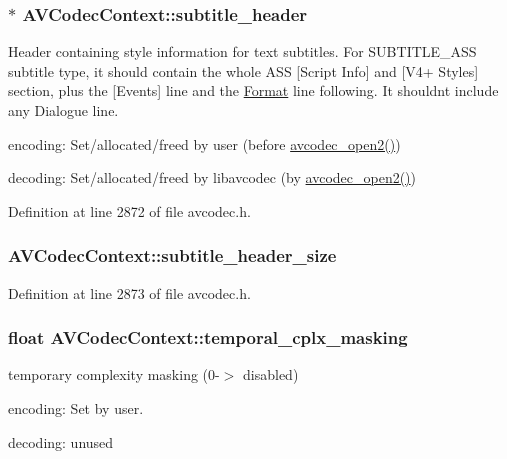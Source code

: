 \subsubsection[{\texorpdfstring{subtitle\+\_\+header}{subtitle_header}}]{$\ast$ A\+V\+Codec\+Context\+::subtitle\+\_\+header}\hypertarget{struct_a_v_codec_context_ab781cbaef6311226481e65a7f1a6d049}{}\label{struct_a_v_codec_context_ab781cbaef6311226481e65a7f1a6d049}
Header containing style information for text subtitles. For S\+U\+B\+T\+I\+T\+L\+E\+\_\+\+A\+SS subtitle type, it should contain the whole A\+SS \mbox{[}Script Info\mbox{]} and \mbox{[}V4+ Styles\mbox{]} section, plus the \mbox{[}Events\mbox{]} line and the \hyperlink{class_format}{Format} line following. It shouldn\textquotesingle{}t include any Dialogue line.
\begin{DoxyItemize}
\item encoding\+: Set/allocated/freed by user (before \hyperlink{group__lavc__core_ga11f785a188d7d9df71621001465b0f1d}{avcodec\+\_\+open2()})
\item decoding\+: Set/allocated/freed by libavcodec (by \hyperlink{group__lavc__core_ga11f785a188d7d9df71621001465b0f1d}{avcodec\+\_\+open2()}) 
\end{DoxyItemize}

Definition at line 2872 of file avcodec.\+h.

\subsubsection[{\texorpdfstring{subtitle\+\_\+header\+\_\+size}{subtitle_header_size}}]{ A\+V\+Codec\+Context\+::subtitle\+\_\+header\+\_\+size}\hypertarget{struct_a_v_codec_context_a0d7c381913c9918caf6969fef8806694}{}\label{struct_a_v_codec_context_a0d7c381913c9918caf6969fef8806694}


Definition at line 2873 of file avcodec.\+h.

\subsubsection[{\texorpdfstring{temporal\+\_\+cplx\+\_\+masking}{temporal_cplx_masking}}]{\setlength{\rightskip}{0pt plus 5cm}float A\+V\+Codec\+Context\+::temporal\+\_\+cplx\+\_\+masking}\hypertarget{struct_a_v_codec_context_a8fccee6f69d7ddf5c01d3042bd2772b3}{}\label{struct_a_v_codec_context_a8fccee6f69d7ddf5c01d3042bd2772b3}
temporary complexity masking (0-\/$>$ disabled)
\begin{DoxyItemize}
\item encoding\+: Set by user.
\item decoding\+: unused 
\end{DoxyItemize}

